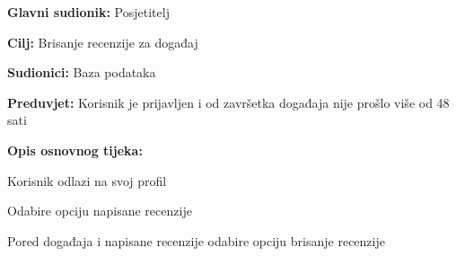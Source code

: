 				\noindent {}
				\begin{packed_item}
					
					\item \textbf{Glavni sudionik: }Posjetitelj
					\item  \textbf{Cilj:} Brisanje recenzije za događaj
					\item  \textbf{Sudionici:} Baza podataka
					\item  \textbf{Preduvjet:} Korisnik je prijavljen i od završetka događaja nije prošlo više od 48 sati
					\item  \textbf{Opis osnovnog tijeka:}
					
					\item[] \begin{packed_enum}
						
						\item Korisnik odlazi na svoj profil
						\item Odabire opciju napisane recenzije
						\item Pored događaja i napisane recenzije odabire opciju brisanje recenzije
					\end{packed_enum}
				\end{packed_item}
				

